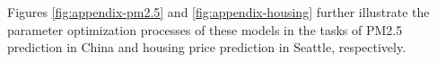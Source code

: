 \documentclass[authoryear,preprint,review,12pt]{elsarticle}
\begin{document}
Figures \ref{fig:appendix-pm2.5} and \ref{fig:appendix-housing} further illustrate the parameter optimization processes of these models in the tasks of PM2.5 prediction in China and housing price prediction in Seattle, respectively.







\end{document}
